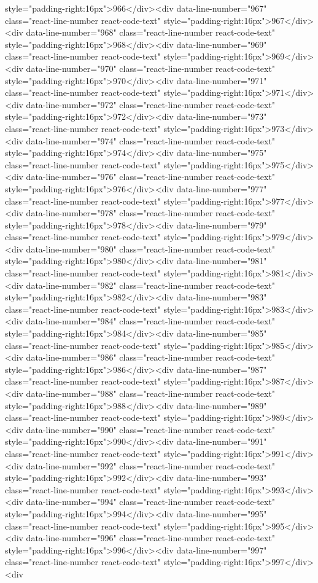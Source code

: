 style="padding-right:16px">966</div><div data-line-number="967" class="react-line-number react-code-text" style="padding-right:16px">967</div><div data-line-number="968" class="react-line-number react-code-text" style="padding-right:16px">968</div><div data-line-number="969" class="react-line-number react-code-text" style="padding-right:16px">969</div><div data-line-number="970" class="react-line-number react-code-text" style="padding-right:16px">970</div><div data-line-number="971" class="react-line-number react-code-text" style="padding-right:16px">971</div><div data-line-number="972" class="react-line-number react-code-text" style="padding-right:16px">972</div><div data-line-number="973" class="react-line-number react-code-text" style="padding-right:16px">973</div><div data-line-number="974" class="react-line-number react-code-text" style="padding-right:16px">974</div><div data-line-number="975" class="react-line-number react-code-text" style="padding-right:16px">975</div><div data-line-number="976" class="react-line-number react-code-text" style="padding-right:16px">976</div><div data-line-number="977" class="react-line-number react-code-text" style="padding-right:16px">977</div><div data-line-number="978" class="react-line-number react-code-text" style="padding-right:16px">978</div><div data-line-number="979" class="react-line-number react-code-text" style="padding-right:16px">979</div><div data-line-number="980" class="react-line-number react-code-text" style="padding-right:16px">980</div><div data-line-number="981" class="react-line-number react-code-text" style="padding-right:16px">981</div><div data-line-number="982" class="react-line-number react-code-text" style="padding-right:16px">982</div><div data-line-number="983" class="react-line-number react-code-text" style="padding-right:16px">983</div><div data-line-number="984" class="react-line-number react-code-text" style="padding-right:16px">984</div><div data-line-number="985" class="react-line-number react-code-text" style="padding-right:16px">985</div><div data-line-number="986" class="react-line-number react-code-text" style="padding-right:16px">986</div><div data-line-number="987" class="react-line-number react-code-text" style="padding-right:16px">987</div><div data-line-number="988" class="react-line-number react-code-text" style="padding-right:16px">988</div><div data-line-number="989" class="react-line-number react-code-text" style="padding-right:16px">989</div><div data-line-number="990" class="react-line-number react-code-text" style="padding-right:16px">990</div><div data-line-number="991" class="react-line-number react-code-text" style="padding-right:16px">991</div><div data-line-number="992" class="react-line-number react-code-text" style="padding-right:16px">992</div><div data-line-number="993" class="react-line-number react-code-text" style="padding-right:16px">993</div><div data-line-number="994" class="react-line-number react-code-text" style="padding-right:16px">994</div><div data-line-number="995" class="react-line-number react-code-text" style="padding-right:16px">995</div><div data-line-number="996" class="react-line-number react-code-text" style="padding-right:16px">996</div><div data-line-number="997" class="react-line-number react-code-text" style="padding-right:16px">997</div><div 